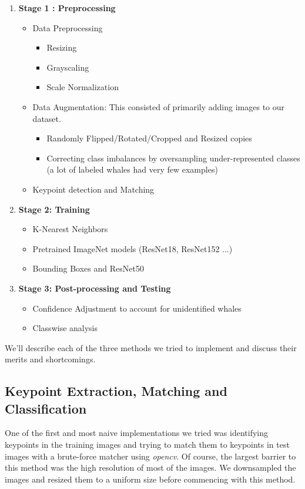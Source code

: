 \begin{enumerate}
	\item \textbf{Stage 1 : Preprocessing}
	\begin{itemize}
		\item Data Preprocessing
		\begin{itemize}
			\item Resizing
			\item Grayscaling
			\item Scale Normalization
		\end{itemize}
		\item Data Augmentation: This consisted of primarily adding images to our dataset.
		\begin{itemize}
			\item Randomly Flipped/Rotated/Cropped and Resized copies
			\item Correcting class imbalances by oversampling under-represented classes (a lot of labeled whales had very few examples)
		\end{itemize}
		\item Keypoint detection and Matching
	\end{itemize}
	\item \textbf{Stage 2: Training}
	\begin{itemize}
		\item K-Nearest Neighbors
		\item Pretrained ImageNet models (ResNet18, ResNet152 ...)
		\item Bounding Boxes and ResNet50
	\end{itemize}
	\item \textbf{Stage 3: Post-processing and Testing}
	\begin{itemize}
		\item Confidence Adjustment to account for unidentified whales
		\item Classwise analysis
	\end{itemize}
\end{enumerate}

We'll describe each of the three methods we tried to implement and discuss their merits and shortcomings.

\subsection{Keypoint Extraction, Matching and Classification}

One of the first and most naive implementations we tried was identifying keypoints in the training images and trying to match them to keypoints in test images with a brute-force matcher using \textit{opencv}. Of course, the largest barrier to this method was the high resolution of most of the images. We downsampled the images and resized them to a uniform size before commencing with this method. 

